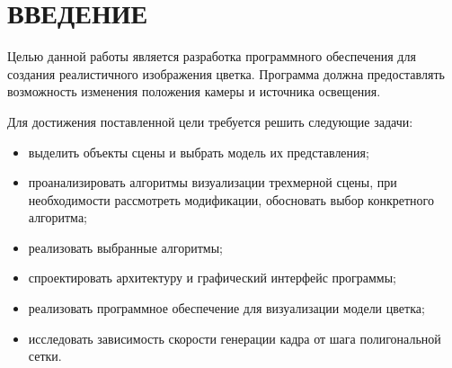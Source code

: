 \chapter*{ВВЕДЕНИЕ}

Целью данной работы является разработка программного обеспечения для создания реалистичного изображения цветка. Программа должна предоставлять возможность изменения положения камеры и источника освещения.

Для достижения поставленной цели требуется решить следующие задачи:
\begin{itemize}[label=---]
	\item выделить объекты сцены и выбрать модель их представления;
	\item проанализировать алгоритмы визуализации трехмерной сцены, при необходимости рассмотреть модификации, обосновать выбор конкретного алгоритма;
	
	\item  реализовать выбранные алгоритмы;
	
	\item спроектировать архитектуру и графический интерфейс программы;
	\item реализовать программное обеспечение для визуализации модели цветка;
	\item исследовать зависимость скорости генерации кадра от шага полигональной сетки.
\end{itemize}
